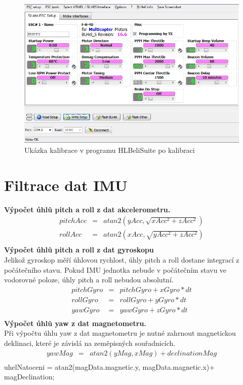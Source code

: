 \begin{figure}[H]
	\centering
	\includegraphics[width=12cm]{pictures/esc_calib6.jpg}
	\caption{Ukázka kalibrace v programu HLBeliSuite po kalibraci}
\end{figure}

\section{Filtrace dat IMU}
\textbf{Výpočet úhlů pitch a roll z dat akcelerometru.}\\
\begin{eqnarray*} 
	pitchAcc & = & atan2 (yAcc , \sqrt{xAcc^{2} + zAcc^{2}})\\
	rollAcc & = & atan2 (xAcc , \sqrt{yAcc^{2} + zAcc^{2}})\\
\end{eqnarray*} 
\textbf{Výpočet úhlů pitch a roll z dat gyroskopu}\\
Jelikož gyroskop měří úhlovou rychlost, úhly pitch a roll dostane integrací z počátečního stavu. Pokud IMU jednotka nebude v počátečním stavu ve vodorovné poloze, úhly pitch a roll nebudou absolutní.\\
\begin{eqnarray*} 
	pitchGyro & = & pitchGyro + xGyro * dt\\
	rollGyro & = & rollGyro + yGyro * dt\\
	yawGyro & = & yawGyro + zGyro * dt\\
\end{eqnarray*} 
\textbf{Výpočet úhlů yaw z dat magnetometru.}\\
Při výpočtu úhlu yaw z dat magnetometru je nutné zahrnout magnetickou deklinaci, které je závislá na zeměpisných souřadnicích. \cite{declination}\\
\begin{eqnarray*} 
	yawMag & = & atan2(yMag, xMag)+ declinationMag\\
\end{eqnarray*} 
uhelNatoceni = atan2(magData.magnetic.y, magData.magnetic.x)+ magDeclination;

